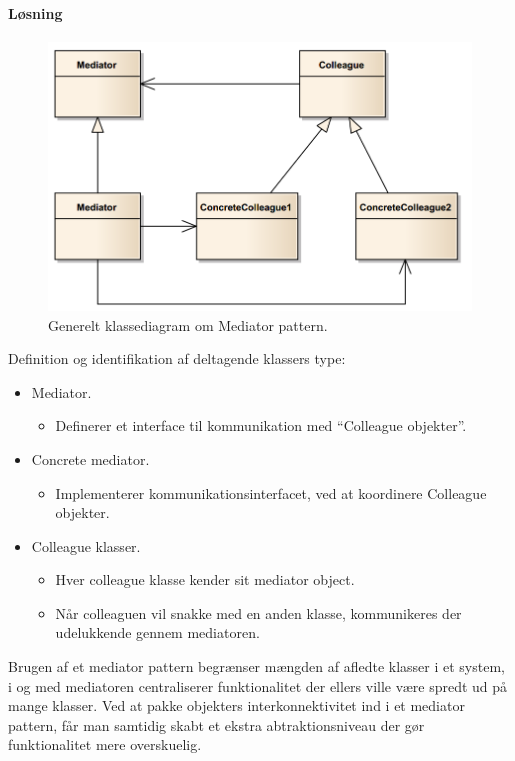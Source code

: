 \paragraph{Løsning}

\begin{figure}[h]
	\centering
	\includegraphics[width=0.8\linewidth]{figs/spm5/concrete}
	\caption{Generelt klassediagram om Mediator pattern.}
	\label{fig:concrete}
\end{figure}

Definition og identifikation af deltagende klassers type:

\begin{itemize}
	\item Mediator.
	\begin{itemize}
		\item 	Definerer et interface til kommunikation med “Colleague objekter”.
	\end{itemize}
	\item Concrete mediator.
	\begin{itemize}
		\item 	Implementerer kommunikationsinterfacet, ved at koordinere Colleague objekter.
	\end{itemize}
	\item Colleague klasser.
	\begin{itemize}
		\item Hver colleague klasse kender sit mediator object.
		\item Når colleaguen vil snakke med en anden klasse, kommunikeres der udelukkende gennem mediatoren.
	\end{itemize}
\end{itemize}

Brugen af et mediator pattern begrænser mængden af afledte klasser i et system, i og med mediatoren centraliserer funktionalitet der ellers ville være spredt ud på mange klasser. Ved at pakke objekters interkonnektivitet ind i et mediator pattern, får man samtidig skabt et ekstra abtraktionsniveau der gør funktionalitet mere overskuelig.

